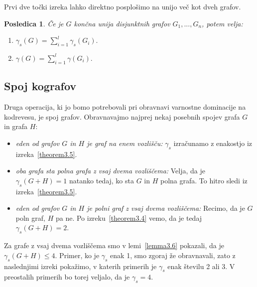 \documentclass[12pt,a4paper,twoside]{article}
\theoremstyle{definition} %
\theoremstyle{plain} %
\newtheorem{posledica}[definicija]{Posledica}
\numberwithin{equation}{section}  %
\begin{document}
Prvi dve točki izreka lahko direktno posplošimo na unijo več kot dveh grafov. 
\begin{posledica}\label{vecUnij} Če je $G$ končna unija disjunktnih grafov $G_1,..., G_n$, potem velja:
\begin{enumerate}[label=(\roman*)]
\item $\gamma_s(G) = \sum\limits_{i=1}^{l} \gamma_s(G_i).$
\item $\gamma(G) = \sum\limits_{i=1}^{l} \gamma(G_i).$
\end{enumerate}
\end{posledica}

\subsection{Spoj kografov} \label{join}
Druga operacija, ki jo bomo potrebovali pri obravnavi varnostne dominacije na kodrevesu, je spoj grafov. Obravnavajmo najprej nekaj posebnih spojev grafa $G$ in grafa $H$:
\begin{itemize}
\item \textit{eden od grafov $G$ in $H$ je graf na enem vozlišču:} $\gamma_s$ izračunamo z enakostjo iz izreka~\ref{theorem3.5}.
\item \textit{oba grafa sta polna grafa z vsaj dvema vozliščema:} Velja, da je $\gamma_s(G + H) = 1$ natanko tedaj, ko sta $G$ in $H$ polna grafa. To hitro sledi iz izreka~\ref{theorem3.5}.
\item \textit{eden od grafov $G$ in $H$ je polni graf z vsaj dvema vozliščema:} Recimo, da je $G$ poln graf, $H$ pa ne. Po izreku~\ref{theorem3.4} vemo, da je tedaj $\gamma_s(G + H) = 2$.
\end{itemize}

Za grafe z vsaj dvema vozliščema smo v lemi~\ref{lemma3.6} pokazali, da je $\gamma_s(G + H) \leq 4$. Primer, ko je $\gamma_s$ enak 1, smo zgoraj že obravnavali, zato z naslednjimi izreki pokažimo, v katerih primerih je $\gamma_s$ enak številu 2 ali 3. V preostalih primerih bo torej veljalo, da je $\gamma_s = 4$.
\end{document}
